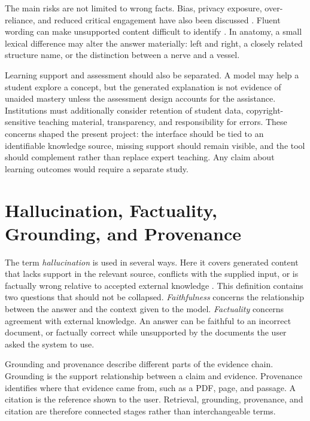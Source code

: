 The main risks are not limited to wrong facts. Bias, privacy exposure, over-reliance, and reduced critical engagement have also been discussed \parencite{kasneci2023,lucas2024medicaleducation}. Fluent wording can make unsupported content difficult to identify \parencite{ji2023}. In anatomy, a small lexical difference may alter the answer materially: left and right, a closely related structure name, or the distinction between a nerve and a vessel.

Learning support and assessment should also be separated. A model may help a student explore a concept, but the generated explanation is not evidence of unaided mastery unless the assessment design accounts for the assistance. Institutions must additionally consider retention of student data, copyright-sensitive teaching material, transparency, and responsibility for errors. These concerns shaped the present project: the interface should be tied to an identifiable knowledge source, missing support should remain visible, and the tool should complement rather than replace expert teaching. Any claim about learning outcomes would require a separate study.

\section{Hallucination, Factuality, Grounding, and Provenance}
\label{sec:hallucination-grounding}

The term \emph{hallucination} is used in several ways. Here it covers generated content that lacks support in the relevant source, conflicts with the supplied input, or is factually wrong relative to accepted external knowledge \parencite{ji2023,wang2024factuality}. This definition contains two questions that should not be collapsed. \emph{Faithfulness} concerns the relationship between the answer and the context given to the model. \emph{Factuality} concerns agreement with external knowledge. An answer can be faithful to an incorrect document, or factually correct while unsupported by the documents the user asked the system to use.

Grounding and provenance describe different parts of the evidence chain. Grounding is the support relationship between a claim and evidence. Provenance identifies where that evidence came from, such as a PDF, page, and passage. A citation is the reference shown to the user. Retrieval, grounding, provenance, and citation are therefore connected stages rather than interchangeable terms.

